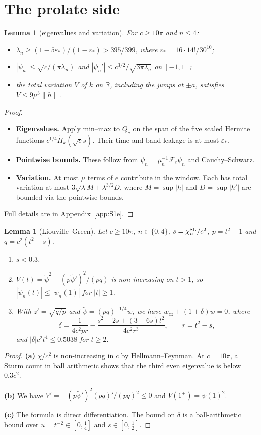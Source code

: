 \documentclass[11pt]{amsart}
\newtheorem{lemma}[proposition]{Lemma}
\theoremstyle{remark}
\numberwithin{equation}{section}
\newcommand{\R}{\mathbb{R}}
\newcommand{\F}{\mathcal{F}}
\begin{document}
\section{The prolate side}\label{sec:prolate}

\begin{lemma}[eigenvalues and variation]\label{lem:S1e}
For $c\ge10\pi$ and $n\le4$:
\begin{itemize}
\item $\lambda_n\ge(1-5\varepsilon_*)/(1-\varepsilon_*)>395/399$, where $\varepsilon_*=16\cdot14!/30^{10}$;
\item $|\psi_n|\le\sqrt{c/(\pi\lambda_n)}$ and $|\psi_n'|\le c^{3/2}/\sqrt{3\pi\lambda_n}$ on $[-1,1]$;
\item the total variation $V$ of $k$ on $\R$, including the jumps at $\pm a$, satisfies $V\le9\mu^3\|h\|$.
\end{itemize}
\end{lemma}
\begin{proof}
\begin{itemize}
\item \textbf{Eigenvalues.} Apply min--max to $Q_c$ on the span of the five scaled Hermite functions $c^{1/4}\tilde H_k(\sqrt cs)$. Their time and band leakage is at most $\varepsilon_*$.
\item \textbf{Pointwise bounds.} These follow from $\psi_n=\mu_n^{-1}\F_c\psi_n$ and Cauchy--Schwarz.
\item \textbf{Variation.} At most $\mu$ terms of $e$ contribute in the window. Each has total variation at most $3\sqrt\lambda M+\lambda^{3/2}D$, where $M=\sup|h|$ and $D=\sup|h'|$ are bounded via the pointwise bounds.
\end{itemize}
Full details are in Appendix~\ref{app:S1e}.
\end{proof}

\begin{lemma}[Liouville--Green]\label{lem:L5a}
Let $c\ge10\pi$, $n\in\{0,4\}$, $s=\chi_n^{\rm SL}/c^2$, $p=t^2-1$ and $q=c^2(t^2-s)$.
\begin{enumerate}
\item[(a)] $s<0.3$.
\item[(b)] $V(t)=\tilde\psi^2+(p\tilde\psi')^2/(pq)$ is non-increasing on $t>1$, so $|\tilde\psi_n(t)|\le|\psi_n(1)|$ for $|t|\ge1$.
\item[(c)] With $z'=\sqrt{q/p}$ and $\tilde\psi=(pq)^{-1/4}w$, we have $w_{zz}+(1+\delta)w=0$, where
\[
\delta=\frac{1}{4c^2pr}-\frac{s^2+2s+(3-6s)t^2}{4c^2r^3},\qquad r=t^2-s,
\]
and $|\delta|c^2t^4\le0.5038$ for $t\ge2$.
\end{enumerate}
\end{lemma}
\begin{proof}
\textbf{(a)} $\chi/c^2$ is non-increasing in $c$ by Hellmann--Feynman. At $c=10\pi$, a Sturm count in ball arithmetic shows that the third even eigenvalue is below $0.3c^2$.

\textbf{(b)} We have $V'=-(p\tilde\psi')^2(pq)'/(pq)^2\le0$ and $V(1^+)=\psi(1)^2$.

\textbf{(c)} The formula is direct differentiation. The bound on $\delta$ is a ball-arithmetic bound over $u=t^{-2}\in[0,\frac14]$ and $s\in[0,\frac12]$.
\end{proof}
\end{document}
